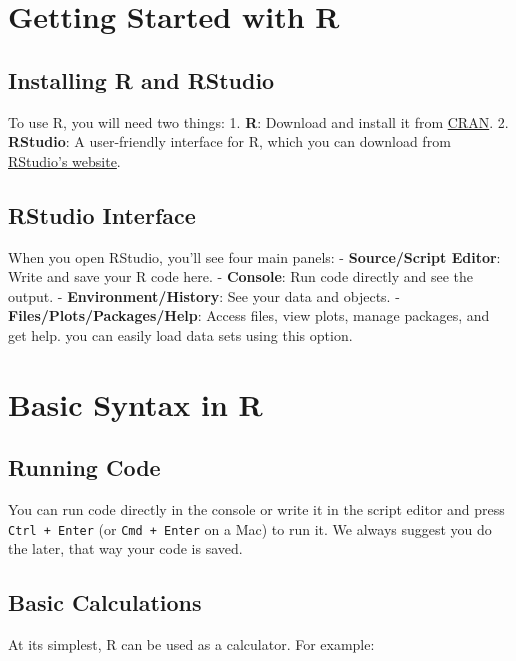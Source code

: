 \documentclass[
]{book}
\begin{document}
\section{Getting Started with R}\label{getting-started-with-r}

\subsection{Installing R and RStudio}\label{installing-r-and-rstudio}

To use R, you will need two things:
1. \textbf{R}: Download and install it from \href{https://cran.r-project.org/}{CRAN}.
2. \textbf{RStudio}: A user-friendly interface for R, which you can download from \href{https://posit.co/download/rstudio-desktop/}{RStudio's website}.

\subsection{RStudio Interface}\label{rstudio-interface}

When you open RStudio, you'll see four main panels:
- \textbf{Source/Script Editor}: Write and save your R code here.
- \textbf{Console}: Run code directly and see the output.
- \textbf{Environment/History}: See your data and objects.
- \textbf{Files/Plots/Packages/Help}: Access files, view plots, manage packages, and get help. you can easily load data sets using this option.

\section{Basic Syntax in R}\label{basic-syntax-in-r}

\subsection{Running Code}\label{running-code}

You can run code directly in the console or write it in the script editor and press \texttt{Ctrl\ +\ Enter} (or \texttt{Cmd\ +\ Enter} on a Mac) to run it. We always suggest you do the later, that way your code is saved.

\subsection{Basic Calculations}\label{basic-calculations}

At its simplest, R can be used as a calculator. For example:
\end{document}
